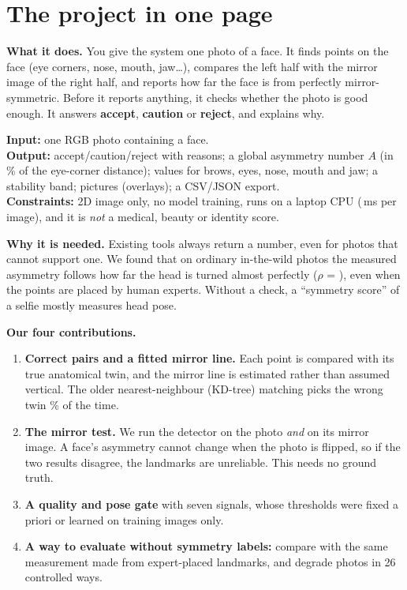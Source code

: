 \section{The project in one page}

\textbf{What it does.} You give the system one photo of a face. It finds points on the
face (eye corners, nose, mouth, jaw\dots), compares the left half with the mirror image of
the right half, and reports how far the face is from perfectly mirror-symmetric. Before it
reports anything, it checks whether the photo is good enough. It answers \textbf{accept},
\textbf{caution} or \textbf{reject}, and explains why.

\textbf{Input:} one RGB photo containing a face.\\
\textbf{Output:} accept/caution/reject with reasons; a global asymmetry number $A$ (in \% of the
eye-corner distance); values for brows, eyes, nose, mouth and jaw; a stability band; pictures
(overlays); a CSV/JSON export.\\
\textbf{Constraints:} 2D image only, no model training, runs on a laptop CPU
(\runtime\,ms per image), and it is \emph{not} a medical, beauty or identity score.

\textbf{Why it is needed.} Existing tools always return a number, even for photos that cannot
support one. We found that on ordinary in-the-wild photos the measured asymmetry follows how
far the head is turned almost perfectly ($\rho$ = \rhoYawRef{}), even when the points are
placed by human experts. Without a check, a ``symmetry score'' of a selfie mostly measures
head pose.

\textbf{Our four contributions.}
\begin{enumerate}
\item \textbf{Correct pairs and a fitted mirror line.} Each point is compared with its true
anatomical twin, and the mirror line is estimated rather than assumed vertical. The older
nearest-neighbour (KD-tree) matching picks the wrong twin \kdWrong\% of the time.
\item \textbf{The mirror test.} We run the detector on the photo \emph{and} on its mirror
image. A face's asymmetry cannot change when the photo is flipped, so if the two results
disagree, the landmarks are unreliable. This needs no ground truth.
\item \textbf{A quality and pose gate} with seven signals, whose thresholds were fixed a priori
or learned on training images only.
\item \textbf{A way to evaluate without symmetry labels:} compare with the same measurement
made from expert-placed landmarks, and degrade photos in 26 controlled ways.
\end{enumerate}

